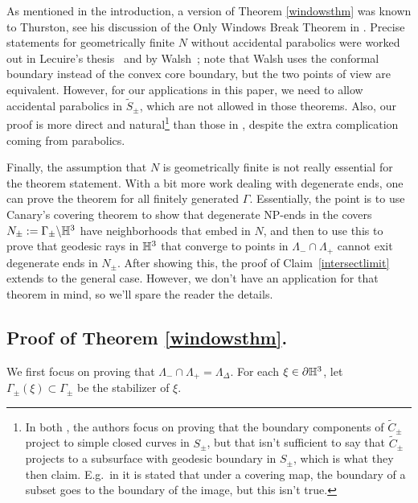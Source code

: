 \documentclass[12pt]{amsart}
\theoremstyle{definition}
\theoremstyle{remark}
\begin{document}
As mentioned in the introduction, a version of Theorem \ref{windowsthm} was known to Thurston, see his discussion of the Only Windows Break Theorem in \cite{Thurstonhyperbolic3}. Precise statements for geometrically finite $N$ without accidental parabolics were worked out in Lecuire's thesis~\cite{lecuire2004structures} and by Walsh~\cite{walsh2014bumping}; note that Walsh uses the conformal boundary instead of the convex core boundary, but the two points of view are equivalent. However, for our applications in this paper, we need to allow accidental parabolics in $\tilde S_\pm$, which are not allowed in those theorems. Also, our proof is more direct and natural\footnote{In both  \cite{walsh2014bumping,lecuire2004structures}, the authors focus on proving that the boundary components of $\tilde C_\pm$ project to simple closed curves in $S_\pm$, but that isn't sufficient to say that $\tilde C_\pm$ projects to a subsurface with geodesic boundary in $S_\pm$, which is what they then claim. E.g.\ in \cite{walsh2014bumping} it is stated that under a covering map, the boundary of a subset goes to the boundary of the image, but this isn't true.}  than those in \cite{walsh2014bumping,lecuire2004structures}, despite the extra complication coming from parabolics. 

Finally, the assumption that $N$ is geometrically finite is not really essential for the theorem statement. With a bit more work dealing with degenerate ends, one can prove the theorem for all finitely generated $\Gamma$. Essentially, the point is to use Canary's covering theorem \cite{Canarycovering} to show that degenerate NP-ends in the covers $N_\pm := \Gamma_\pm \backslash \mathbb H^3$ have neighborhoods that embed in $N$, and then to use this to prove that geodesic rays in $\mathbb H^3$ that converge to points in $\Lambda_- \cap \Lambda_+$ cannot exit degenerate ends in $N_\pm$. After showing this, the proof of Claim~\ref{intersectlimit} extends to the general case. However, we don't have an application for that theorem in mind, so we'll spare the reader the details. 

\subsection*{Proof of Theorem \ref{windowsthm}.} 
We first focus on proving that $\Lambda_-\cap \Lambda_+ = \Lambda_\Delta$. For each $\xi \in \partial \mathbb H^3$, let $\Gamma_\pm(\xi) \subset \Gamma_\pm$ be the stabilizer of $\xi$.
\end{document}
